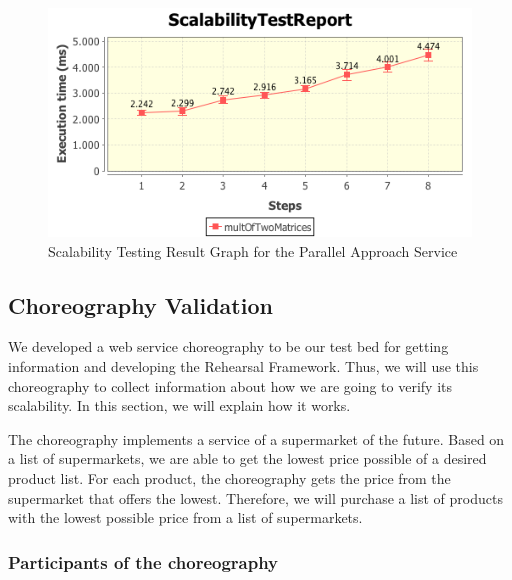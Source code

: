\begin{figure}[htbp]
\begin{center}
	\includegraphics[scale=0.8]{images/multiplicationOfTwoMatricesReport8}
\caption{Scalability Testing Result Graph for the Parallel Approach Service}
\label{dmmParallelGraph}
\end{center}
\end{figure}



\subsection{Choreography Validation}
We developed a web service choreography to be our test bed for getting information and developing the Rehearsal Framework. Thus, we will use this choreography to collect information about how we are going to verify its scalability. In this section, we will explain how it works.

The choreography implements a service of a supermarket of the future. Based on a list of supermarkets, we are able to get the lowest price possible of a desired product list. For each product, the choreography gets the price from the supermarket that offers the lowest. Therefore, we will purchase a list of products with the lowest possible price from a list of supermarkets.

\subsubsection{Participants of the choreography}
\label{participantschoreography}

